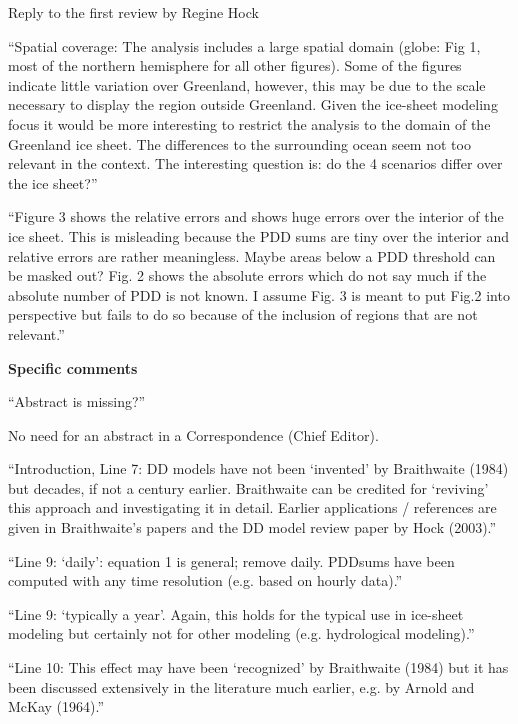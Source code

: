 \documentclass{letter}
\newcommand{\rev}[0]{\color{blue!50!black}\it}
\newcommand{\revpoint}[1]{{\rev\item``#1''}}
\begin{document}
\begin{letter}{Reply to the first review by Regine Hock}
\begin{enumerate}[resume]
    \revpoint{Spatial coverage: The analysis includes a large spatial domain (globe: Fig 1, most of the northern hemisphere for all other figures). Some of the figures indicate little variation over Greenland, however, this may be due to the scale necessary to display the region outside Greenland. Given the ice-sheet modeling focus it would be more interesting to restrict the analysis to the domain of the Greenland ice sheet. The differences to the surrounding ocean seem not too relevant in the context. The interesting question is: do the 4 scenarios differ over the ice sheet?}

    \revpoint{Figure 3 shows the relative errors and shows huge errors over the interior of the ice sheet. This is misleading because the PDD sums are tiny over the interior and relative errors are rather meaningless. Maybe areas below a PDD threshold can be masked out? Fig. 2 shows the absolute errors which do not say much if the absolute number of PDD is not known. I assume Fig. 3 is meant to put Fig.2 into perspective but fails to do so because of the inclusion of regions that are not relevant.}

\end{enumerate}


\textbf{Specific comments}

\begin{enumerate}[resume]

    \revpoint{Abstract is missing?}

    No need for an abstract in a Correspondence (Chief Editor).

    \revpoint{Introduction, Line 7: DD models have not been ‘invented’ by Braithwaite (1984) but decades, if not a century earlier. Braithwaite can be credited for ‘reviving’ this approach and investigating it in detail. Earlier applications / references are given in Braithwaite’s papers and the DD model review paper by Hock (2003).}

    \revpoint{Line 9: ‘daily’: equation 1 is general; remove daily. PDDsums have been computed with any time resolution (e.g. based on hourly data).}

    \revpoint{Line 9: ‘typically a year’. Again, this holds for the typical use in ice-sheet modeling but certainly not for other modeling (e.g. hydrological modeling).}

    \revpoint{Line 10: This effect may have been ‘recognized’ by Braithwaite (1984) but it has been discussed extensively in the literature much earlier, e.g. by Arnold and McKay (1964).}


\end{enumerate}
\end{letter}
\end{document}

